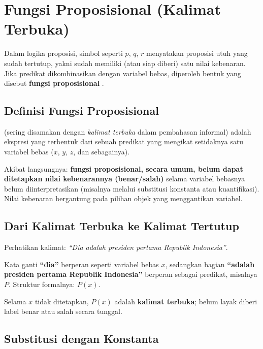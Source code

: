\section{Fungsi Proposisional (Kalimat Terbuka)}

Dalam logika proposisi, simbol seperti $p$, $q$, $r$ menyatakan proposisi utuh yang sudah tertutup, yakni sudah memiliki (atau siap diberi) satu nilai kebenaran. Jika predikat dikombinasikan dengan variabel bebas, diperoleh bentuk yang disebut \textbf{fungsi proposisional} \cite{rosen2019}.

\subsection{Definisi Fungsi Proposisional}

\begin{definisi}
 (sering disamakan dengan \textit{kalimat terbuka} dalam pembahasan informal) adalah ekspresi yang terbentuk dari sebuah predikat yang mengikat setidaknya satu variabel bebas ($x$, $y$, $z$, dan sebagainya).
\end{definisi}

Akibat langsungnya: \textbf{fungsi proposisional, secara umum, belum dapat ditetapkan nilai kebenarannya (benar/salah)} selama variabel bebasnya belum diinterpretasikan (misalnya melalui substitusi konstanta atau kuantifikasi). Nilai kebenaran bergantung pada pilihan objek yang menggantikan variabel.

\subsection{Dari Kalimat Terbuka ke Kalimat Tertutup}

\begin{contoh}
Perhatikan kalimat: \textit{``Dia adalah presiden pertama Republik Indonesia''}.

Kata ganti \textbf{``dia''} berperan seperti variabel bebas $x$, sedangkan bagian \textbf{``adalah presiden pertama Republik Indonesia''} berperan sebagai predikat, misalnya $P$. Struktur formalnya: $P(x)$.

Selama $x$ tidak ditetapkan, $P(x)$ adalah \textbf{kalimat terbuka}; belum layak diberi label benar atau salah secara tunggal.
\end{contoh}

\subsection{Substitusi dengan Konstanta}

